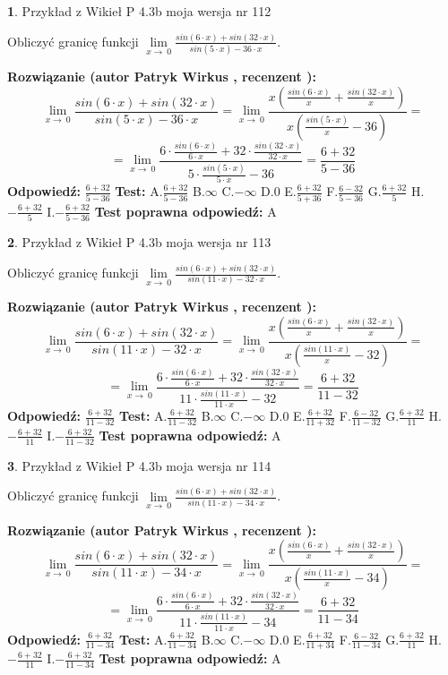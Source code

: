 \documentclass[12pt, a4paper]{article}
\theoremstyle{definition} %
\newtheorem{zad}{}
\newcommand{\zadStart}[1]{\begin{zad}#1\newline}
\newcommand{\zadStop}{\end{zad}}
\newcommand{\rozwStart}[2]{\noindent \textbf{Rozwiązanie (autor #1 , recenzent #2): }\newline}
\newcommand{\rozwStop}{\newline}
\newcommand{\odpStart}{\noindent \textbf{Odpowiedź:}\newline}
\newcommand{\odpStop}{\newline}
\newcommand{\testStart}{\noindent \textbf{Test:}\newline}
\newcommand{\testStop}{\newline}
\newcommand{\kluczStart}{\noindent \textbf{Test poprawna odpowiedź:}\newline}
\newcommand{\kluczStop}{\newline}
\begin{document}
\zadStart{Przykład z Wikieł P 4.3b moja wersja nr 112}


Obliczyć granicę funkcji $\lim\limits_{x\to\ 0}\frac{sin(6 \cdot x)+sin(32 \cdot x)}{sin(5 \cdot x)-36 \cdot x}$.
\zadStop
\rozwStart{Patryk Wirkus}{}
$$\lim\limits_{x\to\ 0}\frac{sin(6 \cdot x)+sin(32 \cdot x)}{sin(5 \cdot x)-36 \cdot x}=\lim\limits_{x\to\ 0}\frac{x(\frac{sin(6 \cdot x)}{x}+\frac{sin(32 \cdot x)}{x})}{x(\frac{sin(5 \cdot x)}{x}-36)}=$$
$$=\lim\limits_{x\to\ 0}\frac{6 \cdot \frac{sin(6 \cdot x)}{6 \cdot x}+32 \cdot \frac{sin(32 \cdot x)}{32 \cdot x}}{5 \cdot \frac{sin(5 \cdot x)}{5 \cdot x}-36}=\frac{6+32}{5-36}$$
\rozwStop
\odpStart
$\frac{6+32}{5-36}$
\odpStop
\testStart
A.$\frac{6+32}{5-36}$
B.$\infty$
C.$-\infty$
D.$0$
E.$\frac{6+32}{5+36}$
F.$\frac{6-32}{5-36}$
G.$\frac{6+32}{5}$
H.$-\frac{6+32}{5}$
I.$-\frac{6+32}{5-36}$
\testStop
\kluczStart
A
\kluczStop



\zadStart{Przykład z Wikieł P 4.3b moja wersja nr 113}


Obliczyć granicę funkcji $\lim\limits_{x\to\ 0}\frac{sin(6 \cdot x)+sin(32 \cdot x)}{sin(11 \cdot x)-32 \cdot x}$.
\zadStop
\rozwStart{Patryk Wirkus}{}
$$\lim\limits_{x\to\ 0}\frac{sin(6 \cdot x)+sin(32 \cdot x)}{sin(11 \cdot x)-32 \cdot x}=\lim\limits_{x\to\ 0}\frac{x(\frac{sin(6 \cdot x)}{x}+\frac{sin(32 \cdot x)}{x})}{x(\frac{sin(11 \cdot x)}{x}-32)}=$$
$$=\lim\limits_{x\to\ 0}\frac{6 \cdot \frac{sin(6 \cdot x)}{6 \cdot x}+32 \cdot \frac{sin(32 \cdot x)}{32 \cdot x}}{11 \cdot \frac{sin(11 \cdot x)}{11 \cdot x}-32}=\frac{6+32}{11-32}$$
\rozwStop
\odpStart
$\frac{6+32}{11-32}$
\odpStop
\testStart
A.$\frac{6+32}{11-32}$
B.$\infty$
C.$-\infty$
D.$0$
E.$\frac{6+32}{11+32}$
F.$\frac{6-32}{11-32}$
G.$\frac{6+32}{11}$
H.$-\frac{6+32}{11}$
I.$-\frac{6+32}{11-32}$
\testStop
\kluczStart
A
\kluczStop



\zadStart{Przykład z Wikieł P 4.3b moja wersja nr 114}


Obliczyć granicę funkcji $\lim\limits_{x\to\ 0}\frac{sin(6 \cdot x)+sin(32 \cdot x)}{sin(11 \cdot x)-34 \cdot x}$.
\zadStop
\rozwStart{Patryk Wirkus}{}
$$\lim\limits_{x\to\ 0}\frac{sin(6 \cdot x)+sin(32 \cdot x)}{sin(11 \cdot x)-34 \cdot x}=\lim\limits_{x\to\ 0}\frac{x(\frac{sin(6 \cdot x)}{x}+\frac{sin(32 \cdot x)}{x})}{x(\frac{sin(11 \cdot x)}{x}-34)}=$$
$$=\lim\limits_{x\to\ 0}\frac{6 \cdot \frac{sin(6 \cdot x)}{6 \cdot x}+32 \cdot \frac{sin(32 \cdot x)}{32 \cdot x}}{11 \cdot \frac{sin(11 \cdot x)}{11 \cdot x}-34}=\frac{6+32}{11-34}$$
\rozwStop
\odpStart
$\frac{6+32}{11-34}$
\odpStop
\testStart
A.$\frac{6+32}{11-34}$
B.$\infty$
C.$-\infty$
D.$0$
E.$\frac{6+32}{11+34}$
F.$\frac{6-32}{11-34}$
G.$\frac{6+32}{11}$
H.$-\frac{6+32}{11}$
I.$-\frac{6+32}{11-34}$
\testStop
\kluczStart
A
\kluczStop
\end{document}
